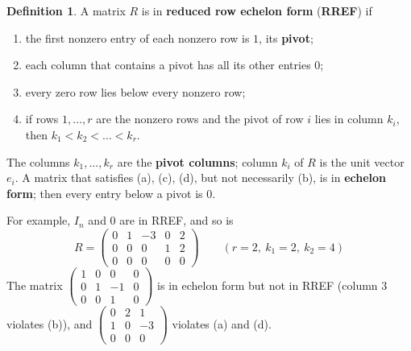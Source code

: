 \documentclass[12pt]{article}
\theoremstyle{definition}
\newtheorem{definition}[theorem]{Definition}
\begin{document}
\begin{definition}\label{r2-def-rref}
A matrix \(R\) is in \textbf{reduced row echelon form} (\textbf{RREF}) if
\begin{enumerate}
\item the first nonzero entry of each nonzero row is \(1\), its \textbf{pivot};
\item each column that contains a pivot has all its other entries \(0\);
\item every zero row lies below every nonzero row;
\item if rows \(1,\dots,r\) are the nonzero rows and the pivot of row \(i\) lies in column
\(k_i\), then \(k_1<k_2<\dots<k_r\).
\end{enumerate}
The columns \(k_1,\dots,k_r\) are the \textbf{pivot columns}; column \(k_i\) of \(R\) is the
unit vector \(e_i\). A matrix that satisfies (a), (c), (d), but not necessarily (b), is in
\textbf{echelon form}; then every entry below a pivot is \(0\).
\end{definition}
For example, \(I_n\) and \(0\) are in RREF, and so is
\[
R=\begin{pmatrix}0&1&-3&0&2\\0&0&0&1&2\\0&0&0&0&0\end{pmatrix}\qquad(r=2,\ k_1=2,\ k_2=4)
\]
The matrix \(\left(\begin{smallmatrix}1&0&0&0\\0&1&-1&0\\0&0&1&0\end{smallmatrix}\right)\) is
in echelon form but not in RREF (column \(3\) violates (b)), and
\(\left(\begin{smallmatrix}0&2&1\\1&0&-3\\0&0&0\end{smallmatrix}\right)\) violates (a) and (d).
\end{document}
